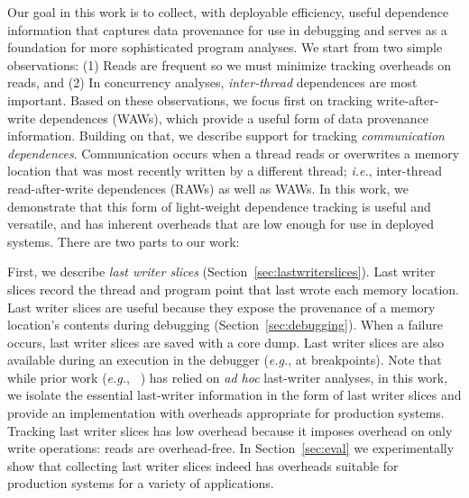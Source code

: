 \documentclass[preprint,9pt]{sigplanconf}
\begin{document}

Our goal in this work is to collect, with deployable efficiency, useful
dependence information that captures data provenance for use in debugging and
serves as a foundation for more sophisticated program analyses.  We start from
two simple observations: (1) Reads are frequent so we must minimize tracking
overheads on reads, and (2) In concurrency analyses, {\em inter-thread}
dependences are most important.  Based on these observations, we focus first on
tracking write-after-write dependences (WAWs), which provide a useful form of
data provenance information.  Building on that, we describe support for
tracking {\em communication dependences}.  Communication occurs when a thread
reads or overwrites a memory location that was most recently written by a
different thread; {\em i.e.}, inter-thread read-after-write dependences (RAWs)
as well as WAWs.  In this work, we demonstrate that this form of light-weight
dependence tracking is useful and versatile, and has inherent overheads that
are low enough for use in deployed systems.  There are two parts to our work:

First, we describe {\em last writer slices}
(Section~\ref{sec:lastwriterslices}).  Last writer slices record the thread and
program point that last wrote each memory location.     Last writer slices are
useful because they expose the provenance of a memory location's contents
during debugging (Section~\ref{sec:debugging}).  When a failure occurs, last
writer slices are saved with a core dump.  Last writer slices are also
available during an execution in the debugger ({\em e.g.}, at breakpoints).
Note that while prior work ({\em e.g.},
~\cite{recon,fasttrack,conmem,conseq,cci}) has relied on {\em ad hoc}
last-writer analyses, in this work, we isolate the essential last-writer
information in the form of last writer slices and provide an implementation
with overheads appropriate for production systems.  Tracking last writer slices
has low overhead because it imposes overhead on only write operations:  reads
are overhead-free.  In Section~\ref{sec:eval} we experimentally show that
collecting last writer slices indeed has overheads suitable for production
systems for a variety of applications.
\end{document}

